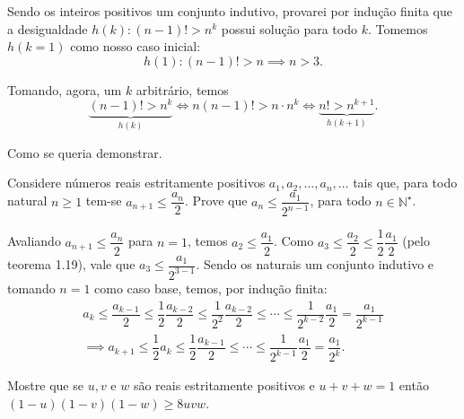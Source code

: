 \documentclass{IMTexam}
\begin{document}
\begin{questions}
\begin{solution}
%		
			
			Sendo os inteiros positivos um conjunto indutivo, provarei por indução finita que a desigualdade $ h(k):(n-1)!>n^{k} $ possui solução para todo $ k $. Tomemos $ h(k=1) $ como nosso caso inicial:
			\[ h(1):(n-1)!>n \implies n > 3. \]
			
			Tomando, agora, um $ k $ arbitrário, temos
			\[ \underbrace{(n-1)!>n^{k}}_{h(k)}\iff n(n-1)!>n\cdot n^{k}\iff \underbrace{ n!> n^{k+1}}_{h(k+1)}. \]
			
			Como se queria demonstrar.
		\end{solution}
		
		 Considere números reais estritamente positivos $ a_1, a_2, \ldots, a_n, \ldots $ tais que, para todo natural $ n \geqslant 1 $ tem-se $ a_{n+1}\leqslant\dfrac{a_n}{2} $. Prove que $ a_n \leqslant \dfrac{a_1}{2^{n-1}} $, para todo $ n \in \mathbb{N}^{\star} $.
		
		\begin{solution}
			Avaliando $ a_{n+1}\leqslant\dfrac{a_n}{2} $ para $ n=1 $, temos $ a_{2}\leqslant\dfrac{a_1}{2} $. Como $ a_3\leqslant \dfrac{a_2}{2}\leqslant\dfrac{1}{2}\dfrac{a_1}{2} $ (pelo teorema 1.19), vale que $ a_3\leqslant \dfrac{a_{1}}{2^{3-1}} $. Sendo os naturais um conjunto indutivo e tomando $ n=1 $ como caso base, temos, por indução finita:
			\begin{gather*}
				a_{k}\leqslant \dfrac{a_{k-1}}{2}\leqslant\dfrac{1}{2}\dfrac{a_{k-2}}{2}\leqslant \dfrac{1}{2^{2}}\dfrac{a_{k-2}}{2}\leqslant \cdots \leqslant \dfrac{1}{2^{k-2}}\dfrac{a_1}{2}=\dfrac{a_1}{2^{k-1}}\\
				\implies a_{k+1}\leqslant\dfrac{1}{2}a_{k}\leqslant\dfrac{1}{2}\dfrac{a_{k-1}}{2}\leqslant \cdots \leqslant \dfrac{1}{2^{k-1}}\dfrac{a_1}{2}=\dfrac{a_1}{2^{k}}.
			\end{gather*}
			
			\hfill \qedsymbol
		\end{solution}
		
		 Mostre que se $ u, v $ e $ w $ são reais estritamente positivos e $ u + v + w = 1 $ então $ (1 − u)(1 − v)(1 − w) \geqslant 8uvw $.
		

\end{questions}
\end{document}

